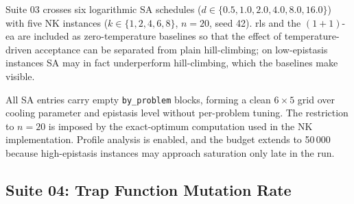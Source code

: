 

Suite 03 crosses six logarithmic SA schedules ($d \in
\{0.5,1.0,2.0,4.0,8.0,16.0\}$) with five NK instances ($k \in \{1,2,4,6,8\}$,
$n=20$, seed 42). \acrshort{rls} and the $(1+1)$-\acrshort{ea} are included as
zero-temperature baselines so that the effect of temperature-driven acceptance
can be separated from plain hill-climbing; on low-epistasis instances SA may in
fact underperform hill-climbing, which the baselines make visible.

All SA entries carry empty \texttt{by\_problem} blocks, forming a clean
$6 \times 5$ grid over cooling parameter and epistasis level without per-problem
tuning. The restriction to $n=20$ is imposed by the exact-optimum computation
used in the NK implementation. Profile analysis is enabled, and the budget
extends to 50\,000 because high-epistasis instances may approach saturation only
late in the run.

\subsection{Suite 04: Trap Function Mutation Rate}



